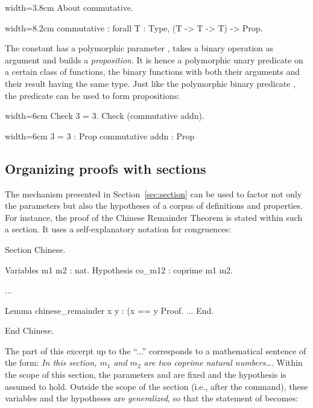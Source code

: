 \begin{coq}{}{width=3.8cm}
About commutative.
\end{coq}
\begin{coqout}{}{width=8.2cm}
commutative : forall T : Type, (T -> T -> T) -> Prop.
\end{coqout}
The constant  has a polymorphic parameter ,
takes a binary operation as argument and builds a
\emph{proposition}. It is hence a polymorphic unary predicate on
a certain class of functions, the binary functions with both their
arguments and their result having the same type. Just like the
polymorphic binary predicate , the predicate  can
be used to form propositions:

\begin{coq}{}{width=6cm}
Check 3 = 3.
Check (commutative addn).
\end{coq}
\begin{coqout}{}{width=6cm}
3 = 3 : Prop
commutative addn : Prop
\end{coqout}


\subsection{Organizing proofs with sections}

The  mechanism presented in Section~\ref{sec:section} can
be used to factor not only the parameters but also the hypotheses of a
corpus of definitions and properties. For instance, the proof of the
Chinese Remainder Theorem is stated within such a section. It uses a
self-explanatory notation for congruences:

\begin{coq}{}{}
Section Chinese.

Variables m1 m2 : nat.
Hypothesis co_m12 : coprime m1 m2.

...

Lemma chinese_remainder x y :
  (x == y %
Proof.
...
End.

End Chinese.
\end{coq}
The part of this excerpt up to the ``...''
corresponds to a mathematical sentence of the form: \emph{In this section,
  $m_1$ and $m_2$ are two coprime natural numbers\dots}. Within the
scope of this section, the parameters  and  are
fixed and the hypothesis  is assumed to hold.
Outside the scope of the section (i.e., after the
 command), these variables and the hypotheses are
\emph{generalized}, so that the statement of 
becomes:

